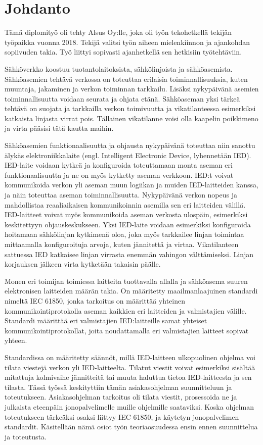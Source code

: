 \chapter{Johdanto}
\label{ch:johdanto}
Tämä diplomityö oli tehty Alsus Oy:lle, joka oli työn tekohetkellä tekijän työpaikka vuonna 2018. Tekijä valitsi työn aiheen mielenkiinnon ja ajankohdan sopiivuden takia. Työ liittyi sopivasti ajanhetkellä sen hetkisiin työtehtäviin.

Sähköverkko koostuu tuotantolaitoksista, sähkölinjoista ja sähköasemista. Sähköasemien tehtävä verkossa on toteuttaa erilaisia toiminnallisuuksia, kuten muuntaja, jakaminen ja verkon toiminnan tarkkailu. Lisäksi nykypäivänä asemien toiminnallisuutta voidaan seurata ja ohjata etänä. Sähköaseman yksi tärkeä tehtävä on suojata ja tarkkailla verkon toimivuutta ja vikatilanteessa esimerkiksi katkaista linjasta virrat pois. Tällainen vikatilanne voisi olla kaapelin poikkimeno ja virta pääsisi tätä kautta maihin.

Sähköasemien funktionaalisuutta ja ohjausta nykypäivänä toteuttaa niin sanottu älykäs elektroniikkalaite (engl. Intelligent Electronic Device, lyhennetään IED). IED-laite voidaan kytkeä ja konfiguroida toteuttamaan monta aseman eri funktionaalisuutta ja ne on myös kytketty aseman verkkoon. IED:t voivat kommunikoida verkon yli aseman muun logiikan ja muiden IED-laitteiden kanssa, ja näin toteuttaa aseman toiminnallisuutta. Nykypäivänä verkon nopeus ja mahdollistaa reaaliaikaisen kommunikoinnin asemilla sen eri laitteiden välillä. IED-laitteet voivat myös kommunikoida aseman verkosta ulospäin, esimerkiksi keskitettyyn ohjauskeskukseen. Yksi IED-laite voidaan esimerkiksi konfiguroida hoitamaan sähkölinjan kytkimenä oloa, joka myös tarkkailee linjan toimintaa mittaamalla konfiguroituja arvoja, kuten jännitettä ja virtaa. Vikatilanteen sattuessa IED katkaisee linjan virrasta enemmän vahingon välttämiseksi. Linjan korjauksen jälkeen virta kytketään takaisin päälle.

Monen eri toimijan toimiessa laitteita tuottavalla allalla ja sähköasema suuren elektronisen laitteiden määrän takia. On määritetty maailmanlaajuinen standardi nimeltä IEC 61850, jonka tarkoitus on määrittää yhteinen kommunikointiprotokolla aseman kaikkien eri laitteiden ja valmistajien välille. Standardi määrittää eri valmistajien IED:laitteille samat yhteiset kommunikointiprotokollat, joita noudattamalla eri valmistajien laitteet sopivat yhteen.

Standardissa on määritetty säännöt, millä IED-laitteen ulkopuolinen ohjelma voi tilata viestejä verkon yli IED-laitteelta. Tilatut viestit voivat esimerkiksi sisältää mitattuja kolmivaihe jännitteitä tai muuta haluttua tietoa IED-laitteesta ja sen tilasta. Tässä työssä keskityttiin tämän asiakasohjelman suunnitteluun ja toteutukseen. Asiakasohjelman tarkoitus oli tilata viestit, prosessoida ne ja julkaista eteenpäin jonopalvelimelle muille ohjelmille saataviksi. Koska ohjelman toteutukseen tärkeäksi osaksi liittyy IEC 61850, ja käytetyn jonopalvelimen standardit. Käsitellään nämä osiot työn teoriaosuudessa ensin ennen suunnittelua ja toteutusta.

